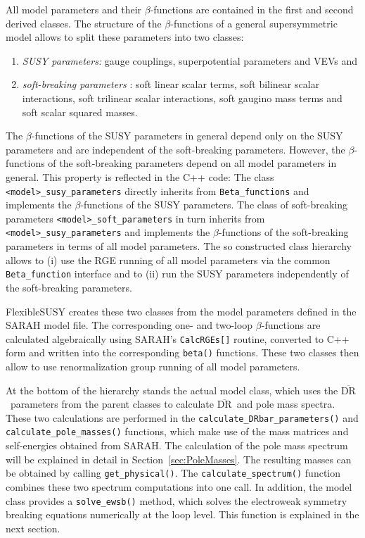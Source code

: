 \documentclass[final,3p,11pt,pdflatex]{elsarticle}
\makeatletter
\newcommand{\fs}{FlexibleSUSY\@\xspace}
\newcommand{\code}[1]{\lstinline|#1|}  %
\newcommand{\textoverline}[1]{$\overline{\mbox{#1}}$}
\newcommand{\DRbar}{\textoverline{DR}\xspace}
\newcommand{\secref}[1]{Section~\ref{#1}}
\makeatother
\begin{document}
All model parameters and their $\beta$-functions are contained in
the first and second derived classes.  The structure of the
$\beta$-functions of a general supersymmetric model
\cite{Jones:1974pg,Jones:1983vk,West:1984dg,Martin:1993yx,Yamada:1993ga,MV94,Fonseca:2011vn,Yam94,Sperling:2013eva,Sperling:2013xqa}
allows to split these parameters into two classes:
%
\begin{enumerate}
\item \emph{SUSY parameters:} gauge couplings, superpotential
  parameters and VEVs and
\item \emph{soft-breaking parameters} \cite{Girardello:1981wz}: soft
  linear scalar terms, soft bilinear scalar interactions, soft
  trilinear scalar interactions, soft gaugino mass terms and soft
  scalar squared masses.
\end{enumerate}
%
The $\beta$-functions of the SUSY parameters in general depend only on
the SUSY parameters and are independent of the soft-breaking
parameters.  However, the $\beta$-functions of the soft-breaking
parameters depend on all model parameters in general.
%
This property is reflected in the C++ code: The class
\code{<model>_susy_parameters} directly inherits from
\code{Beta_functions} and implements the $\beta$-functions of the SUSY
parameters.  The class of soft-breaking parameters
\code{<model>_soft_parameters} in turn inherits from
\code{<model>_susy_parameters} and implements the $\beta$-functions of
the soft-breaking parameters in terms of all model parameters.  The so
constructed class hierarchy allows to (i) use the RGE running of all
model parameters via the common \code{Beta_function} interface and to
(ii) run the SUSY parameters independently of the soft-breaking
parameters.

\fs creates these two classes from the model parameters defined in the
SARAH model file.  The corresponding one- and two-loop
$\beta$-functions are calculated algebraically using SARAH's
\code{CalcRGEs[]} routine, converted to C++ form and written into the
corresponding \code{beta()} functions.  These two classes then allow
to use renormalization group running of all model parameters.

At the bottom of the hierarchy stands the actual model class, which
uses the \DRbar\ parameters from the parent classes to calculate
\DRbar\ and pole mass spectra.  These two calculations are performed
in the \code{calculate_DRbar_parameters()} and
\code{calculate_pole_masses()} functions, which make use of the mass
matrices and self-energies obtained from SARAH.  The calculation of
the pole mass spectrum will be explained in detail in
\secref{sec:PoleMasses}.  The resulting masses can be obtained by
calling \code{get_physical()}.  The \code{calculate_spectrum()}
function combines these two spectrum computations into one call.  In
addition, the model class provides a \code{solve_ewsb()} method, which
solves the electroweak symmetry breaking equations numerically at the
loop level.  This function is explained in the next section.
\end{document}
